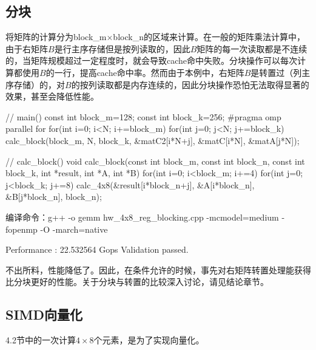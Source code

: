 \documentclass[UTF8,10pt]{ctexart}
\begin{document}
\subsection{分块}
将矩阵的计算分为block\_m$\times $block\_n的区域来计算。在一般的矩阵乘法计算中，由于右矩阵$B$是行主序存储但是按列读取的，因此$B$矩阵的每一次读取都是不连续的，当矩阵规模超过一定程度时，就会导致cache命中失败。分块操作可以每次计算都使用$B$的一行，提高cache命中率。然而由于本例中，右矩阵$B$是转置过（列主序存储）的，对$B$的按列读取都是内存连续的，因此分块操作恐怕无法取得显著的效果，甚至会降低性能。
\begin{python}
// main()
const int block_m=128;
const int block_k=256;
#pragma omp parallel for
for(int i=0; i<N; i+=block_m)
    for(int j=0; j<N; j+=block_k)
        calc_block(block_m, N, block_k, &matC2[i*N+j], &matC[i*N], &matA[j*N]);

// calc_block()
void calc_block(const int block_m, const int block_n, const int block_k,
                int *result, int *A, int *B)
{
    for(int i=0; i<block_m; i+=4)
        for(int j=0; j<block_k; j+=8)
            calc_4x8(&result[i*block_n+j], &A[i*block_n], &B[j*block_n], block_n);
}
\end{python}
\begin{python}
编译命令：g++ -o gemm hw_4x8_reg_blocking.cpp -mcmodel=medium -fopenmp -O -march=native
\end{python}
\begin{python}
Performance : 22.532564 Gops
Validation passed.
\end{python}
不出所料，性能降低了。因此，在条件允许的时候，事先对右矩阵转置处理能获得比分块更好的性能。关于分块与转置的比较深入讨论，请见结论章节。

\subsection{SIMD向量化}
4.2节中的一次计算$4\times 8$个元素，是为了实现向量化。
\end{document}
